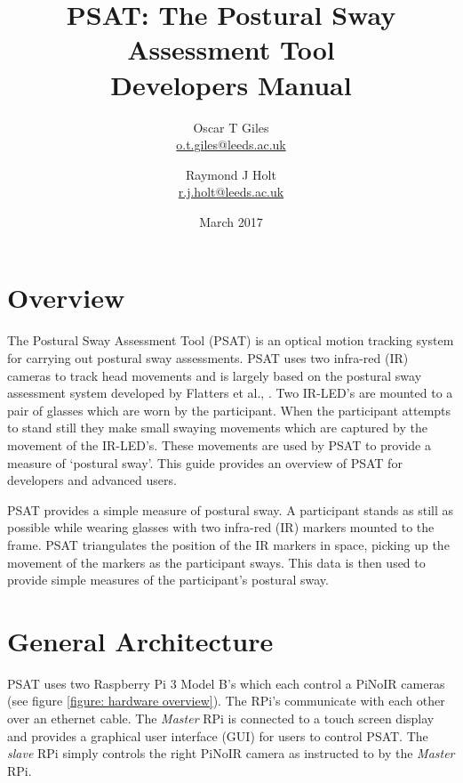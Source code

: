 \documentclass[12pt,a4paper]{report}
\begin{document}
	\graphicspath{ {./images/} }
	\title{PSAT: The Postural Sway Assessment Tool\\ Developers Manual}
	\author{Oscar T Giles \\  \href{mailto:o.t.giles@leeds.ac.uk}{o.t.giles@leeds.ac.uk} 
		\and Raymond J Holt \\  \href{mailto:r.j.holt@leeds.ac.uk}{r.j.holt@leeds.ac.uk} }
	\date{March 2017}
	\maketitle
	
	\tableofcontents
	\newpage
	
	\section{Overview}
	
	The Postural Sway Assessment Tool (PSAT) is an optical motion tracking system for carrying out postural sway assessments. PSAT uses two infra-red (IR) cameras to track head movements and is largely based on the postural sway assessment system developed by Flatters et al., \cite{Flatters2014a}. Two IR-LED's are mounted to a pair of glasses which are worn by the participant. When the participant attempts to stand still they make small swaying movements which are captured by the movement of the IR-LED's. These movements are used by PSAT to provide a measure of `postural sway'. This guide provides an overview of PSAT for developers and advanced users.
	
	PSAT provides a simple measure of postural sway. A participant stands as still as possible while wearing glasses with two infra-red (IR) markers mounted to the frame. PSAT triangulates the position of the IR markers in space, picking up the movement of the markers as the participant sways. This data is then used to provide simple measures of the participant's postural sway.
	
	\section{General Architecture}
	
	PSAT uses two Raspberry Pi 3 Model B's which each control a PiNoIR cameras (see figure \ref{figure: hardware overview}). The RPi's communicate with each other over an ethernet cable. The \textit{Master} RPi is connected to a touch screen display and provides a graphical user interface (GUI) for users to control PSAT. The \textit{slave} RPi simply controls the right PiNoIR camera as instructed to by the \textit{Master} RPi.
	
\end{document}
